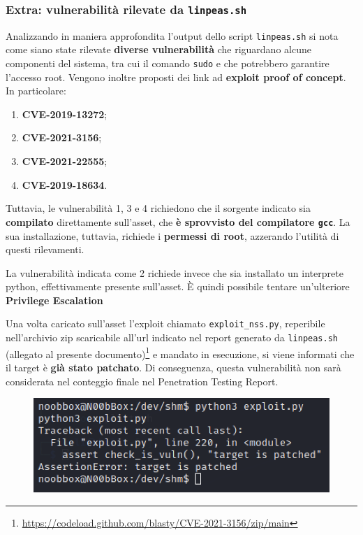 \documentclass[a4paper, 12pt, oneside]{article}
\begin{document}
\subsubsection{Extra: vulnerabilità rilevate da \texttt{linpeas.sh}}
Analizzando in maniera approfondita l'output dello script \texttt{linpeas.sh} si nota come siano state rilevate \textbf{diverse vulnerabilità} che riguardano alcune componenti del sistema, tra cui il comando \texttt{sudo} e che potrebbero garantire l'accesso root. Vengono inoltre proposti dei link ad \textbf{exploit proof of concept}. In particolare:

\begin{enumerate}
    \item \textbf{CVE-2019-13272};
    \item \textbf{CVE-2021-3156};
    \item \textbf{CVE-2021-22555};
    \item \textbf{CVE-2019-18634}.
\end{enumerate}

Tuttavia, le vulnerabilità 1, 3 e 4 richiedono che il sorgente indicato sia \textbf{compilato} direttamente sull'asset, che \textbf{è sprovvisto del compilatore \texttt{gcc}}. La sua installazione, tuttavia, richiede i \textbf{permessi di root}, azzerando l'utilità di questi rilevamenti.

La vulnerabilità indicata come 2 richiede invece che sia installato un interprete python, effettivamente presente sull'asset. È quindi possibile tentare un'ulteriore \textbf{Privilege Escalation}

Una volta caricato sull'asset l'exploit chiamato \texttt{exploit\_nss.py}, reperibile nell'archivio zip scaricabile all'url indicato nel report generato da \texttt{linpeas.sh} (allegato al presente documento)\footnote{\url{https://codeload.github.com/blasty/CVE-2021-3156/zip/main}} e mandato in esecuzione, si viene informati che il target è \textbf{già stato patchato}. Di conseguenza, questa vulnerabilità non sarà considerata nel conteggio finale nel Penetration Testing Report.

\begin{figure}[h!]
    \centering
    \includegraphics[width=\textwidth]{img/patched.png}
\end{figure}
\end{document}
